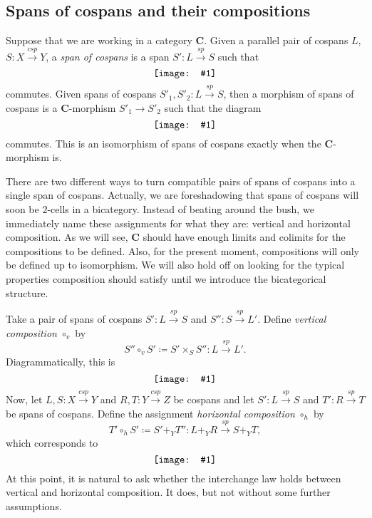 \documentclass[11pt]{amsart}
\newcommand{\cat}[1]{\mathbf{#1}}
\newcommand{\from}{\colon}
\renewcommand{\span}{\xrightarrow{\mathit{sp}}}
\newcommand{\cospan}{\xrightarrow{\mathit{csp}}}
\newcommand{\diagram}[1]{\raisebox{-0.5\height}{\texttt{[image: \#1]}}}
\theoremstyle{remark}
\theoremstyle{definition}
\begin{document}
\subsection{Spans of cospans and their compositions} %
%

Suppose that we are working in a category $\cat{C}$. Given a parallel pair of cospans $L$, $S \from X \cospan Y$, a \emph{span of cospans} is a span $S' \from L \span S$ such that
\[
	\label{NoRef_SpanOfCospanDef}
	\diagram{NoRef_SpanOfCospanDef}
\]
commutes. Given spans of cospans $S'_1,S'_2 \from L \span S$, then a morphism of spans of cospans is a $\cat{C}$-morphism $S'_1 \to S'_2$ such that the diagram
%
\begin{equation} 
	\label{diag.2-cell iso}
	\diagram{Diag_2CellIso}
\end{equation}
commutes. This is an isomorphism of spans of  cospans exactly when the  $\cat{C}$-morphism is.

There are two different ways to turn compatible pairs of spans of cospans into a single span of cospans.  Actually, we are foreshadowing that spans of cospans will soon be $2$-cells in a bicategory. Instead of beating around the bush, we immediately name these assignments for what they are: vertical and horizontal composition. As we will see, $\cat{C}$ should have enough limits and colimits for the compositions to be defined. Also, for the present moment, compositions will only be defined up to isomorphism. We will also hold off on looking for the typical properties composition should satisfy until we introduce the bicategorical structure. 

Take a pair of spans of cospans $S' \from L \span S$ and $S'' \from S \span L'$. Define \textit{vertical composition} $\circ_v$ by 
%
\begin{equation}
\label{eq.VertComp}
	S'' \circ_v S' \coloneqq S' \times_S S'' \from L \span L'.
\end{equation}
%
Diagrammatically, this is
\[
	\label{NoRef_VertCompDef}
	\diagram{NoRef_VertCompDef}
\]
Now, let $L,S \from X \cospan Y$ and $R,T \from Y \cospan Z$ be cospans and let $S' \from L \span S$ and $T' \from R \span T$ be spans of cospans.  Define the assignment \textit{horizontal composition} $\circ_h$ by 
\begin{equation}
\label{eq.HorComp}
	T' \circ_h S' \coloneqq S' +_Y T'' \from L +_Y R \span S +_Y T,
\end{equation} 
which corresponds to 
\[
	\label{NoRef_HorCompDef}
	\diagram{NoRef_HorCompDef}
\]
At this point, it is natural to ask whether the interchange law holds between vertical and horizontal composition. It does, but not without some further assumptions. 
%
%
%
%
%
%
\end{document}
